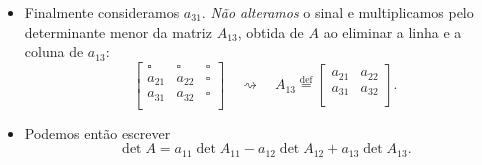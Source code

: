 \documentclass[../livro.tex]{subfiles}  %
\begin{document}
\begin{itemize}
\begin{equation}
\end{equation}
\item Finalmente consideramos $a_{31}$. \textit{Não alteramos} o sinal e multiplicamos pelo determinante menor da matriz $A_{13}$, obtida de $A$ ao eliminar a linha e a coluna de $a_{13}$:
\begin{equation}
\begin{bmatrix}
\square & \square & \square \\
a_{21}  & a_{22}  & \square \\
a_{31}  & a_{32}  & \square \\
\end{bmatrix} \quad \rightsquigarrow \quad A_{13} \stackrel{\text{def}}{=} 
\begin{bmatrix}
a_{21}  & a_{22} \\
a_{31}  & a_{32} \\
\end{bmatrix}.
\end{equation} 
\item Podemos então escrever
\begin{equation}\label{detminor}
\boxed{\det A = a_{11} \det A_{11} - a_{12} \det A_{12} +  a_{13} \det A_{13}.}
\end{equation}
\end{itemize}
\end{document}
